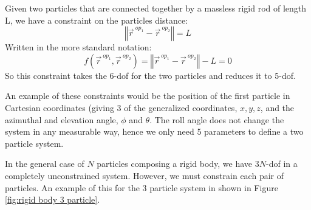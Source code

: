 \documentclass[12pt]{report}
\begin{document}
Given two particles that are connected together by a massless rigid rod of length L, we have a constraint on the particles distance:
$$\left\Vert \vec{r}^{\ op_1}-\vec{r}^{\ op_2}\right\Vert=L$$
Written in the more standard notation:
$$f\left(\vec{r}^{\ op_1},\vec{r}^{\ op_2}\right)=\left\Vert \vec{r}^{\ op_1}-\vec{r}^{\ op_2}\right\Vert-L=0$$
So this constraint takes the 6-\gls{dof} for the two particles and reduces it to 5-\gls{dof}.

An example of these constraints would be the position of the first particle in Cartesian coordinates (giving 3 of the generalized coordinates, $x,y,z$, and the azimuthal and elevation angle, $\phi$ and $\theta$. The roll angle does not change the system in any measurable way, hence we only need 5 parameters to define a two particle system.

In the general case of $N$ particles composing a rigid body, we have $3N$-\gls{dof} in a completely unconstrained system. However, we must constrain each pair of particles. An example of this for the 3 particle system in shown in Figure \ref{fig:rigid body 3 particle}.
\end{document}
